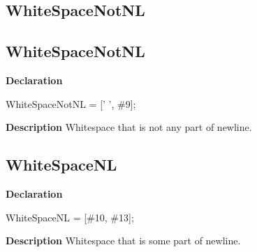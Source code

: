 \documentclass{report}
\newif\ifpdf
\begin{document}
\subsection*{\large{\textbf{WhiteSpaceNotNL}}\normalsize\hspace{1ex}\hrulefill}
\else
\subsection*{WhiteSpaceNotNL}
\fi
\label{PasDoc_Utils-WhiteSpaceNotNL}
\begin{list}{}{
\setlength{\itemindent}{0cm}
\setlength{\listparindent}{0cm}
\setlength{\leftmargin}{\evensidemargin}
\addtolength{\leftmargin}{\tmplength}
\settowidth{\labelsep}{X}
\addtolength{\leftmargin}{\labelsep}
\setlength{\labelwidth}{\tmplength}
}
\item[\textbf{Declaration}\hfill]
\ifpdf
\begin{flushleft}
\fi
\begin{ttfamily}
WhiteSpaceNotNL = [' ', {\#}9];\end{ttfamily}

\ifpdf
\end{flushleft}
\fi

\par
\item[\textbf{Description}]
Whitespace that is not any part of newline.

\end{list}
\ifpdf
\subsection*{\large{\textbf{WhiteSpaceNL}}\normalsize\hspace{1ex}\hrulefill}
\else
\subsection*{WhiteSpaceNL}
\fi
\label{PasDoc_Utils-WhiteSpaceNL}
\begin{list}{}{
\setlength{\itemindent}{0cm}
\setlength{\listparindent}{0cm}
\setlength{\leftmargin}{\evensidemargin}
\addtolength{\leftmargin}{\tmplength}
\settowidth{\labelsep}{X}
\addtolength{\leftmargin}{\labelsep}
\setlength{\labelwidth}{\tmplength}
}
\item[\textbf{Declaration}\hfill]
\ifpdf
\begin{flushleft}
\fi
\begin{ttfamily}
WhiteSpaceNL = [{\#}10, {\#}13];\end{ttfamily}

\ifpdf
\end{flushleft}
\fi

\par
\item[\textbf{Description}]
Whitespace that is some part of newline.

\end{list}
\ifpdf
\end{document}

